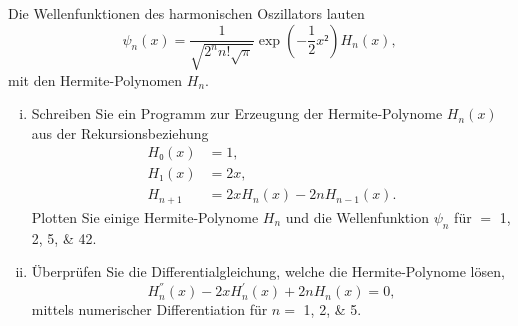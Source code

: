 \begin{question}[subtitle=Harmonischer Oszillator]
  Die Wellenfunktionen des harmonischen Oszillators lauten
  \begin{equation}
   ψ_n(x) = \frac{1}{\sqrt{2^n n! \sqrt{π}}} \exp \left( -\frac{1}{2}x² \right) H_n(x),
  \end{equation}
  mit den Hermite-Polynomen $H_n$.
  \begin{enumerate}[(i)]
  \item Schreiben Sie ein Programm zur Erzeugung der Hermite-Polynome $H_n(x)$ aus der Rekursionsbeziehung
    \begin{align}
      H₀ (x) & = 1,\\
      H₁ (x) & = 2x, \\
      H_{n + 1} & = 2x H_n(x) - 2n H_{n - 1} (x).
    \end{align}
    Plotten Sie einige Hermite-Polynome $H_n$ und die Wellenfunktion $ψ_n$ für $
    =$ \numlist{1;2;5;42}.
  \item Überprüfen Sie die Differentialgleichung, welche die Hermite-Polynome lösen,
    \begin{equation}
     H^{''}_{n} (x) - 2x H^{'}_n(x) + 2nH_n(x) = 0,
   \end{equation}
   mittels numerischer Differentiation für $n =$ \numlist{1;2;5}.
  \end{enumerate}
\end{question}
